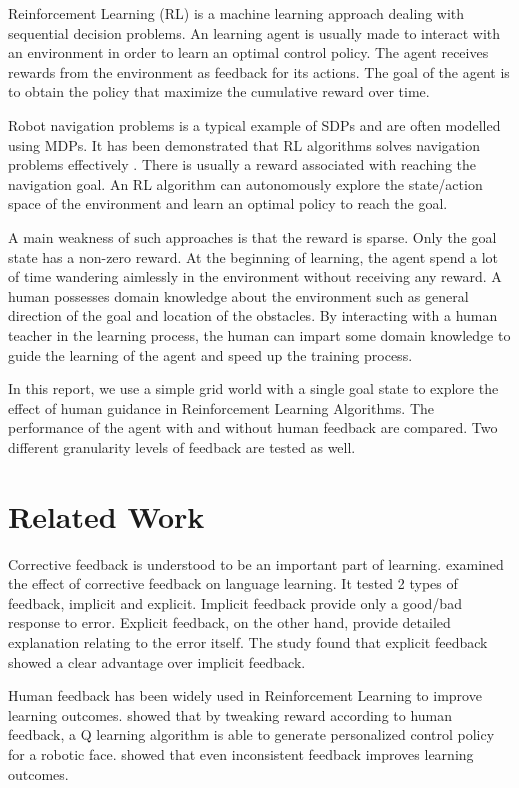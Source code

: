 \documentclass[conference]{IEEEtran}
\begin{document}
Reinforcement Learning (RL) is a machine learning approach dealing with sequential decision problems. An learning agent is usually made to interact with an environment in order to learn an optimal control policy. The agent receives rewards from the environment as feedback for its actions. The goal of the agent is to obtain the policy that maximize the cumulative reward over time.

Robot navigation problems is a typical example of SDPs and are often modelled using MDPs. It has been demonstrated that RL algorithms solves navigation problems effectively \cite{zhuDeepReinforcementLearning2021}. There is usually a reward associated with reaching the navigation goal. An RL algorithm can autonomously explore the state/action space of the environment and learn an optimal policy to reach the goal.

A main weakness of such approaches is that the reward is sparse. Only the goal state has a non-zero reward. At the beginning of learning, the agent spend a lot of time wandering aimlessly in the environment without receiving any reward. A human possesses domain knowledge about the environment such as general direction of the goal and location of the obstacles. By interacting with a human teacher in the learning process, the human can impart some domain knowledge to guide the learning of the agent and speed up the training process.

In this report, we use a simple grid world with a single goal state to explore the effect of human guidance in Reinforcement Learning Algorithms. The performance of the agent with and without human feedback are compared. Two different granularity levels of feedback are tested as well.

\section{Related Work}

Corrective feedback is understood to be an important part of learning. \cite{ellisIMPLICITEXPLICITCORRECTIVE2006} examined the effect of corrective feedback on language learning. It tested 2 types of feedback, implicit and explicit. Implicit feedback provide only a good/bad response to error. Explicit feedback, on the other hand, provide detailed explanation relating to the error itself. The study found that explicit feedback showed a clear advantage over implicit feedback.

Human feedback has been widely used in Reinforcement Learning \cite{liHumanCenteredReinforcementLearning2019} to improve learning outcomes. \cite{iidaGeneratingPersonalityCharacter1998} showed that by tweaking reward according to human feedback, a Q learning algorithm is able to generate personalized control policy for a robotic face. \cite{tenorio-gonzalezDynamicRewardShaping2010} showed that even inconsistent feedback improves learning outcomes.
\end{document}
